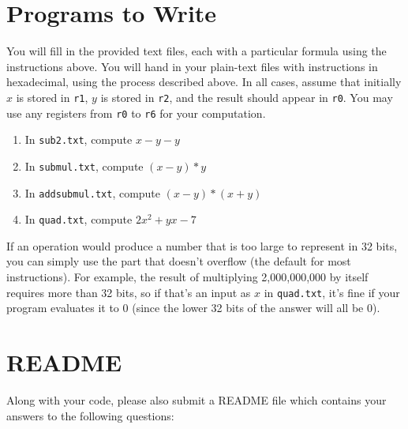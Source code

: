 \documentclass{article}
\def\r#1{\texttt{r#1}}
\begin{document}
\section{Programs to Write}

You will fill in the provided text files, each with a particular formula using
the instructions above. You will hand in your plain-text files with
instructions in hexadecimal, using the process described above. In all cases,
assume that initially $x$ is stored in \r{1}, $y$ is stored in \r{2}, and the
result should appear in \r{0}. You may use any registers from \r{0} to \r{6}
for your computation.

\begin{enumerate}
\item In {\tt sub2.txt}, compute $x - y - y$
\item In {\tt submul.txt}, compute $(x - y) * y$
\item In {\tt addsubmul.txt}, compute $(x - y) * (x + y)$
\item In {\tt quad.txt}, compute $2x^2 + yx - 7$
\end{enumerate}

If an operation would produce a number that is too large to represent in 32
bits, you can simply use the part that doesn't overflow (the default for most
instructions). For example, the result of multiplying 2,000,000,000 by itself
requires more than 32 bits, so if that's an input as $x$ in {\tt quad.txt},
it's fine if your program evaluates it to 0 (since the lower 32 bits of the
answer will all be 0).

\section{README}

Along with your code, please also submit a README file which contains your 
answers to the following questions:
\end{document}
